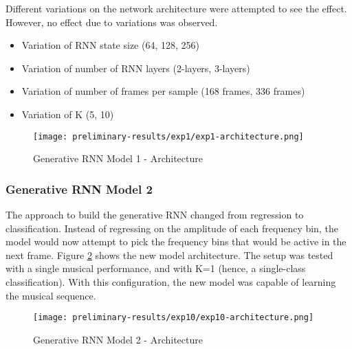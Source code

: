 \documentclass[../main.tex]{subfiles}
\begin{document}
\iffalse
 Figure \ref{fig:exp1-performance} shows the model loss when trained for 500 epochs.
\fi
 

\par
Different variations on the network architecture were attempted to see the effect. However, no effect due to variations was observed.
\begin{itemize}
    \item Variation of RNN state size (64, 128, 256)
    \item Variation of number of RNN layers (2-layers, 3-layers)
    \item Variation of number of frames per sample (168 frames, 336 frames)
    \item Variation of K (5, 10)
\end{itemize}



\begin{figure}[h]
    \centering
    \texttt{[image: preliminary-results/exp1/exp1-architecture.png]}
    \caption{Generative RNN Model 1 - Architecture}
    \label{fig:exp1-architecture}
\end{figure}


\iffalse
\begin{figure}[h]
    \centering
    \texttt{[image: preliminary-results/exp1/exp1-performance.png]}
    \caption{Generative RNN Model 1 - Performance}
    \label{fig:exp1-performance}
\end{figure}
\fi

\subsubsection{Generative RNN Model 2}

\par
The approach to build the generative RNN changed from regression to classification. Instead of regressing on the amplitude of each frequency bin, the model would now attempt to pick the frequency bins that would be active in the next frame. Figure \ref{fig:exp10-architecture} shows the new model architecture. The setup was tested with a single musical performance, and with K=1 (hence, a single-class classification). With this configuration, the new model was capable of learning the musical sequence. 
\iffalse
Figure \ref{fig:exp10-performance} shows the model loss when trained for 500 epochs.
\fi

\begin{figure}[h]
    \centering
    \texttt{[image: preliminary-results/exp10/exp10-architecture.png]}
    \caption{Generative RNN Model 2 - Architecture}
    \label{fig:exp10-architecture}
\end{figure}
\end{document}
